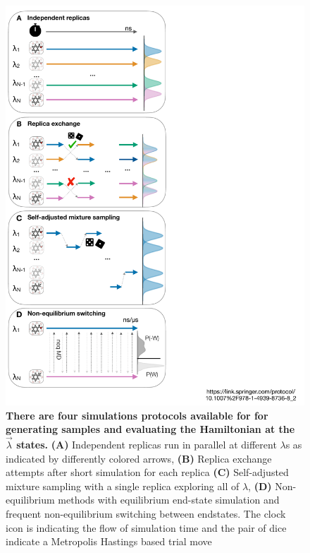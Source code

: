 \documentclass[9pt,bestpractices]{livecoms}
\begin{document}
\begin{figure}
    \includegraphics[width=0.95\linewidth]{figures/setup/protocol/Figure.pdf}
    \caption{\textbf{There are four simulations protocols available for for generating samples and evaluating the Hamiltonian at the $\vec{\lambda}$ states.} \textbf{(A)} Independent replicas run in parallel at different $\lambda$s as indicated by differently colored arrows, \textbf{(B)} Replica exchange attempts after short simulation for each replica \textbf{(C)} Self-adjusted mixture sampling with a single replica exploring all of $\lambda$, \textbf{(D)} Non-equilibrium methods with equilibrium end-state simulation and frequent non-equilibrium switching between endstates. The clock icon is indicating the flow of simulation time and the pair of dice indicate a Metropolis Hastings based trial move}
    \label{fig:protocols}
\end{figure}
\end{document}
